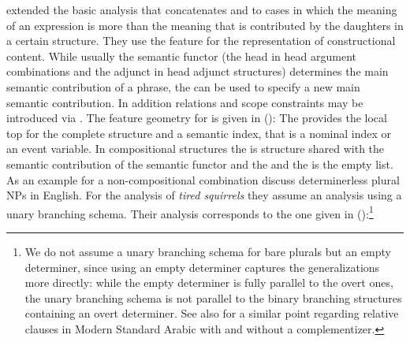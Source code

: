 \begin{exe}
\begin{xlist}[iv.]
\begin{exe}
\begin{xlist}[iv.]
\begin{exe}
\begin{xlist}[iv.]
 extended the basic analysis that concatenates \rels and \hcons to cases in which
the meaning of an expression is more than the meaning that is contributed by the daughters in a
certain structure. They use the feature  for the representation of constructional
content. While usually the semantic functor (the head in head argument combinations and the adjunct
in head adjunct structures) determines the main semantic contribution of a phrase, the \ccontf can
be used to specify a new main semantic contribution. In addition relations and scope constraints may
be introduced via \ccont. The feature geometry for \ccont is given in ():
\ea
{}
\z
The  provides the local top for the complete structure and a semantic index, that is a
nominal index or an event variable. In compositional structures the \hookv is structure shared with
the semantic contribution of the semantic functor and the \relsl and the \hconsl is the empty
list. As an example for a non-compositional combination  discuss determinerless
plural NPs in English. For the analysis of \emph{tired squirrels} they assume an analysis using a unary branching
schema. Their analysis corresponds to the one given in ():\footnote{
    We do not assume a unary branching schema for bare plurals but an empty determiner, since using
    an empty determiner captures the generalizations more directly: while the empty determiner is
    fully parallel to the overt ones, the unary branching schema is not parallel to the binary
    branching structures containing an overt determiner. See also  for a similar
    point regarding relative clauses in Modern Standard Arabic with and without a complementizer.
}
\ea
{}
\end{xlist}
\end{exe}
\end{xlist}
\end{exe}
\end{xlist}
\end{exe}
